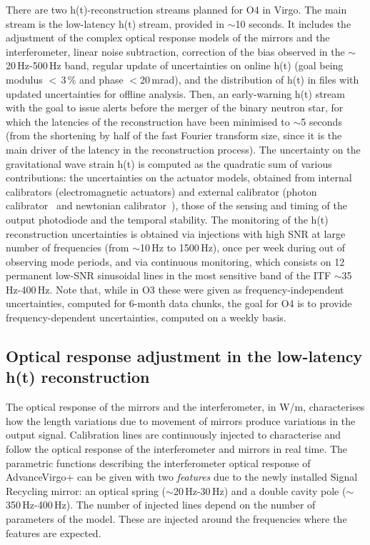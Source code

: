 \documentclass{moriond}
\begin{document}
There are two h(t)-reconstruction streams planned for O4 in Virgo. The main stream is the low-latency h(t) stream, provided in $\sim$10 seconds. It includes the adjustment of the complex optical response models of the mirrors and the interferometer, linear noise subtraction, correction of the bias observed in the $\sim$20$\,$Hz-500$\,$Hz band, regular update of uncertainties on online h(t) (goal being modulus $<$$\,$3$\,$\% and phase $<$20$\,$mrad), and the distribution of h(t) in files with updated uncertainties for offline analysis. Then, an early-warning h(t) stream with the goal to issue alerts before the merger of the binary neutron star, for which the latencies of the reconstruction have been minimised to $\sim$5 seconds (from the shortening by half of the fast Fourier transform size, since it is the main driver of the latency in the reconstruction process). The uncertainty on the gravitational wave strain h(t) is computed as the quadratic sum of various contributions: the uncertainties on the actuator models, obtained from internal calibrators (electromagnetic actuators) and external calibrator (photon calibrator~\cite{3} and newtonian calibrator~\cite{4}), those of the sensing and timing of the output photodiode and the temporal stability. The monitoring of the h(t) reconstruction uncertainties is obtained via injections with high SNR at large number of frequencies (from $\sim$10$\,$Hz to 1500$\,$Hz), once per week during out of observing mode periods, and via continuous monitoring, which consists on 12 permanent low-SNR sinusoidal lines in the most sensitive band of the ITF $\sim$35$\,$Hz-400$\,$Hz. Note that, while in O3 these were given as frequency-independent uncertainties, computed for 6-month data chunks, the goal for O4 is to provide frequency-dependent uncertainties, computed on a weekly basis.

\subsection{Optical response adjustment in the low-latency h(t) reconstruction}
The optical response of the mirrors and the interferometer, in W/m, characterises how the length variations due to movement of mirrors produce variations in the output signal. Calibration lines are continuously injected to characterise and follow the optical response of the interferometer and mirrors in real time. The parametric functions describing the interferometer optical response of AdvanceVirgo+ can be given with two \textit{features} due to the newly installed Signal Recycling mirror: an optical spring ($\sim$20$\,$Hz-30$\,$Hz) and a double cavity pole ($\sim$350$\,$Hz-400$\,$Hz). The number of injected lines depend on the number of parameters of the model. These are injected around the frequencies where the features are expected.
      
\end{document}
